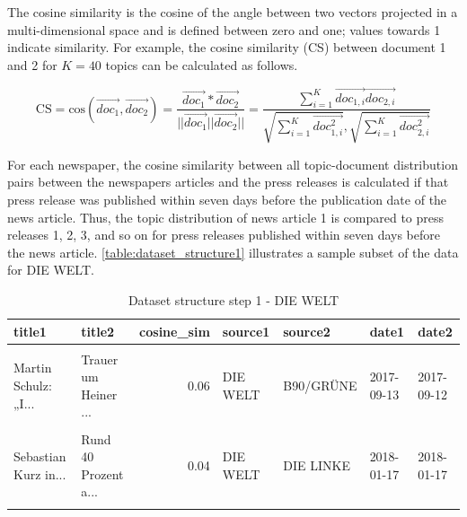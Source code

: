 \documentclass[
  12pt,
]{article}
\begin{document}
The cosine similarity is the cosine of the angle between two vectors
projected in a multi-dimensional space and is defined between zero and
one; values towards 1 indicate similarity. For example, the cosine
similarity (CS) between document 1 and 2 for \(K=40\) topics can be
calculated as follows.

\[
\text{CS} = \text{cos}(\vec{doc_1},\vec{doc_2})=\frac{\vec{doc_1}*\vec{doc_2}}{||\vec{doc_1}||\vec{doc_2}||}=\frac{\sum^K_{i=1} \vec{doc_{1,i}}\vec{doc_{2,i}}}{\sqrt{\sum^K_{i=1} \vec{doc^2_{1,i}}}, \sqrt{\sum^K_{i=1}\vec{doc^2_{2,i}}}}
\]

For each newspaper, the cosine similarity between all topic-document
distribution pairs between the newspapers articles and the press
releases is calculated if that press release was published within seven
days before the publication date of the news article. Thus, the topic
distribution of news article 1 is compared to press releases 1, 2, 3,
and so on for press releases published within seven days before the news
article. \autoref{table:dataset_structure1} illustrates a sample subset
of the data for DIE WELT.

\begin{table}[H]

\caption{\label{tab:Dataset structure 1}Dataset structure step 1 - DIE WELT \label{table:dataset_structure1}}
\centering
\fontsize{7}{9}\selectfont
\begin{tabular}[t]{llrllll}
\toprule
title1 & title2 & cosine\_sim & source1 & source2 & date1 & date2\\
\midrule
\cellcolor{gray!6}{Behördenpanne: Zu...} & \cellcolor{gray!6}{André Poggenburg:...} & \cellcolor{gray!6}{0.41} & \cellcolor{gray!6}{DIE WELT} & \cellcolor{gray!6}{AfD} & \cellcolor{gray!6}{2017-11-18} & \cellcolor{gray!6}{2017-11-14}\\
Martin Schulz: „I... & Trauer um Heiner ... & 0.06 & DIE WELT & B90/GRÜNE & 2017-09-13 & 2017-09-12\\
\cellcolor{gray!6}{Terrorgefahr: IS-...} & \cellcolor{gray!6}{Erbschaftsteuer: ...} & \cellcolor{gray!6}{0.06} & \cellcolor{gray!6}{DIE WELT} & \cellcolor{gray!6}{SPD} & \cellcolor{gray!6}{2017-08-03} & \cellcolor{gray!6}{2017-07-28}\\
Sebastian Kurz in... & Rund 40 Prozent a... & 0.04 & DIE WELT & DIE LINKE & 2018-01-17 & 2018-01-17\\
\cellcolor{gray!6}{Vzbv-Chef Klaus M...} & \cellcolor{gray!6}{Waldemar Herdt: R...} & \cellcolor{gray!6}{0.36} & \cellcolor{gray!6}{DIE WELT} & \cellcolor{gray!6}{AfD} & \cellcolor{gray!6}{2018-01-15} & \cellcolor{gray!6}{2018-01-10}\\
\bottomrule
\end{tabular}
\end{table}
\end{document}
